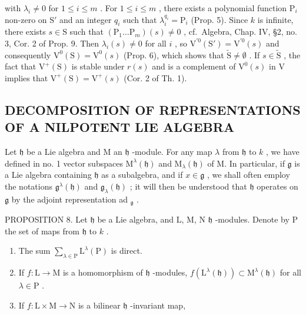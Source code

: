 with \(\lambda_{i} \neq 0\) for \(1 \leq i \leq m\) . For \(1 \leq i \leq m\) , there exists a polynomial function \(\mathrm{P}_{i}\) non-zero on \(\mathrm{S}'\) and an integer \(q_{i}\) such that \(\lambda_{i}^{q_{i}} = \mathrm{P}_{i}\) (Prop. 5). Since \(k\) is infinite, there exists \(s \in \mathrm{S}\) such that \((\mathrm{P}_{1} \ldots \mathrm{P}_{m})(s) \neq 0\) , cf.~Algebra, Chap. IV, §2, no. 3, Cor. 2 of Prop. 9. Then \(\lambda_{i}(s) \neq 0\) for all \(i\) , so \(\mathrm{V}^{\prime 0}(\mathrm{S}') = \mathrm{V}^{\prime 0}(s)\) and consequently \(\mathrm{V}^{0}(\mathrm{S}) = \mathrm{V}^{0}(s)\) (Prop. 6), which shows that \(\tilde{\mathrm{S}} \neq \emptyset\) . If \(s \in \tilde{\mathrm{S}}\) , the fact that \(\mathrm{V}^{+}(\mathrm{S})\) is stable under \(r(s)\) and is a complement of \(\mathrm{V}^{0}(s)\) in V implies that \(\mathrm{V}^{+}(\mathrm{S}) = \mathrm{V}^{+}(s)\) (Cor. 2 of Th. 1).

\subsection{DECOMPOSITION OF REPRESENTATIONS OF A NILPOTENT LIE ALGEBRA}

Let \(\mathfrak{h}\) be a Lie algebra and M an \(\mathfrak{h}\) -module. For any map \(\lambda\) from \(\mathfrak{h}\) to \(k\) , we have defined in no. 1 vector subspaces \(\mathrm{M}^{\lambda}(\mathfrak{h})\) and \(\mathrm{M}_{\lambda}(\mathfrak{h})\) of M. In particular, if \(\mathfrak{g}\) is a Lie algebra containing \(\mathfrak{h}\) as a subalgebra, and if \(x \in \mathfrak{g}\) , we shall often employ the notations \(\mathfrak{g}^{\lambda}(\mathfrak{h})\) and \(\mathfrak{g}_{\lambda}(\mathfrak{h})\) ; it will then be understood that \(\mathfrak{h}\) operates on \(\mathfrak{g}\) by the adjoint representation ad \(_{\mathfrak{g}}\) .

PROPOSITION 8. Let \(\mathfrak{h}\) be a Lie algebra, and L, M, N \(\mathfrak{h}\) -modules. Denote by P the set of maps from \(\mathfrak{h}\) to \(k\) .

\begin{enumerate}
\def\labelenumi{(\roman{enumi})}
\item
  The sum \(\sum_{\lambda \in \mathrm{P}}\mathrm{L}^{\lambda}(\mathrm{P})\) is direct.
\item
  If \(f: \mathrm{L} \to \mathrm{M}\) is a homomorphism of \(\mathfrak{h}\) -modules, \(f(\mathrm{L}^{\lambda}(\mathfrak{h})) \subset \mathrm{M}^{\lambda}(\mathfrak{h})\) for all \(\lambda \in \mathrm{P}\) .
\item
  If \(f:\mathrm{L}\times \mathrm{M}\to \mathrm{N}\) is a bilinear \(\mathfrak{h}\) -invariant map,
\end{enumerate}

